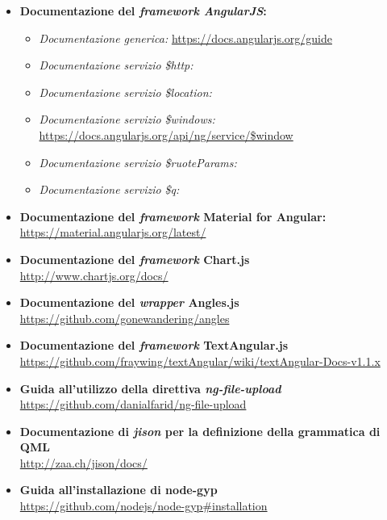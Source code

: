 \begin{itemize}
	\item \textbf{Documentazione del \textit{framework AngularJS}:} \\
	\begin{itemize}
		\item \textit{Documentazione generica:} \url{https://docs.angularjs.org/guide}
		\item \textit{Documentazione servizio \$http:} 
		\item \textit{Documentazione servizio \$location:} 
		\item \textit{Documentazione servizio \$windows:} \url{https://docs.angularjs.org/api/ng/service/$window}
		\item \textit{Documentazione servizio \$ruoteParams:} 
		\item \textit{Documentazione servizio \$q:} 
	\end{itemize}
	\item \textbf{Documentazione del \textit{framework} Material for Angular:} \\
		\url{https://material.angularjs.org/latest/}
	\item \textbf{Documentazione del \textit{framework} Chart.js} \\
		\url{http://www.chartjs.org/docs/}
	\item \textbf{Documentazione del \textit{wrapper} Angles.js} \\
		\url{https://github.com/gonewandering/angles}
	\item \textbf{Documentazione del \textit{framework} TextAngular.js} \\
		\url{https://github.com/fraywing/textAngular/wiki/textAngular-Docs-v1.1.x}
	\item \textbf{Guida all'utilizzo della direttiva \textit{ng-file-upload}} \\
		\url{https://github.com/danialfarid/ng-file-upload}
	\item \textbf{Documentazione di \textit{jison} per la definizione della grammatica di QML} \\
		\url{http://zaa.ch/jison/docs/}
	\item \textbf{Guida all'installazione di node-gyp}\\
		\url{https://github.com/nodejs/node-gyp#installation}
\end{itemize}